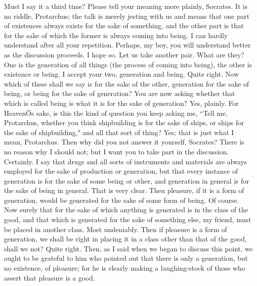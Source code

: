 \documentclass[letterpaper,12pt]{article}
\newcommand{\stephpag}[1]{\marginnote{\small\itshape\fontfamily{ppl}\selectfont #1}}
\begin{document}
\begin{drama}
\protarchusspeaks
Must I say it a third time? Please tell your meaning more plainly, Socrates.
\socratesspeaks
It is no riddle, Protarchus; the talk is merely jesting with us and means that one part of existences always exists for the sake of something, and the other part is that for the sake of which the former is always coming into being.
\protarchusspeaks
I can hardly understand after all your repetition.
\socratesspeaks
Perhaps, my boy, you will understand better \stephpag{54 a} as the discussion proceeds.
\protarchusspeaks
I hope so.
\socratesspeaks
Let us take another pair.
\protarchusspeaks
What are they?
\socratesspeaks
One is the generation of all things (the process of coming into being), the other is existence or being.
\protarchusspeaks
I accept your two, generation and being.
\socratesspeaks
Quite right. Now which of these shall we say is for the sake of the other, generation for the sake of being, or being for the sake of generation?
\protarchusspeaks
You are now asking whether that which is called being is what it is for the sake of generation?
\socratesspeaks
Yes, plainly. \stephpag{b}
\protarchusspeaks
For HeavenÕs sake, is this the kind of question you keep asking me, ``Tell me, Protarchus, whether you think shipbuilding is for the sake of ships, or ships for the sake of shipbuilding," and all that sort of thing?
\socratesspeaks
Yes; that is just what I mean, Protarchus.
\protarchusspeaks
Then why did you not answer it yourself, Socrates?
\socratesspeaks
There is no reason why I should not; but I want you to take part in the discussion.
\protarchusspeaks
Certainly.
\socratesspeaks
I say that drugs and all sorts of instruments \stephpag{c} and materials are always employed for the sake of production or generation, but that every instance of generation is for the sake of some being or other, and generation in general is for the sake of being in general.
\protarchusspeaks
That is very clear.
\socratesspeaks
Then pleasure, if it is a form of generation, would be generated for the sake of some form of being.
\protarchusspeaks
Of course.
\socratesspeaks
Now surely that for the sake of which anything is generated is in the class of the good, and that which is generated for the sake of something else, my friend, must be placed in another class. \stephpag{d}
\protarchusspeaks
Most undeniably.
\socratesspeaks
Then if pleasure is a form of generation, we shall be right in placing it in a class other than that of the good, shall we not?
\protarchusspeaks
Quite right.
\socratesspeaks
Then, as I said when we began to discuss this point, we ought to be grateful to him who pointed out that there is only a generation, but no existence, of pleasure; for he is clearly making a laughing-stock of those who assert that pleasure is a good.

\end{drama}
\end{document}
